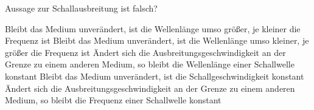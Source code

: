 \documentclass[11pt]{exam}
\begin{document}
\begin{questions}
\vspace{3mm}\question Aussage zur Schallausbreitung ist falsch?

\begin{choices}
	\choice Bleibt das Medium unverändert, ist die Wellenlänge umso größer, je kleiner die Frequenz ist
	\choice Bleibt das Medium unverändert, ist die Wellenlänge umso kleiner, je größer die Frequenz ist
	\choice Ändert sich die Ausbreitungsgeschwindigkeit an der Grenze zu einem anderen Medium, so bleibt die Wellenlänge einer Schallwelle konstant
	\choice Bleibt das Medium unverändert, ist die Schallgeschwindigkeit konstant
	\choice Ändert sich die Ausbreitungsgeschwindigkeit an der Grenze zu einem anderen Medium, so bleibt die Frequenz einer Schallwelle konstant
\end{choices}

\vspace{3mm}\end{questions}
\end{document}
